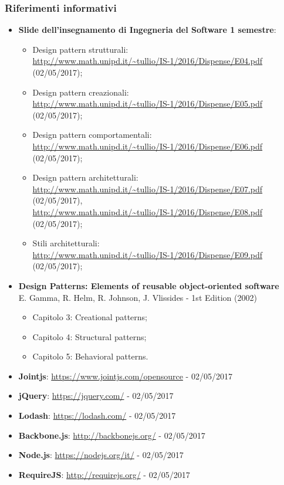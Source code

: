 \documentclass[../DefinizioneDiProdotto.tex]{subfiles}
\begin{document}
			\subsubsection{Riferimenti informativi}	
				\begin{itemize}
					\item \textbf{Slide dell'insegnamento di Ingegneria del Software
					1 semestre}:
					\begin{itemize}
						\item Design pattern strutturali:\\
						\url{http://www.math.unipd.it/~tullio/IS-1/2016/Dispense/E04.pdf} (02/05/2017);
						\item Design pattern creazionali:\\
						\url{http://www.math.unipd.it/~tullio/IS-1/2016/Dispense/E05.pdf} (02/05/2017);
						\item Design pattern comportamentali:\\
						\url{http://www.math.unipd.it/~tullio/IS-1/2016/Dispense/E06.pdf} (02/05/2017);
						\item Design pattern architetturali:\\
						\url{http://www.math.unipd.it/~tullio/IS-1/2016/Dispense/E07.pdf} (02/05/2017),\\
						\url{http://www.math.unipd.it/~tullio/IS-1/2016/Dispense/E08.pdf} (02/05/2017);
						\item Stili architetturali:\\
						\url{http://www.math.unipd.it/~tullio/IS-1/2016/Dispense/E09.pdf} (02/05/2017);
					\end{itemize}
					\item \textbf{Design Patterns: Elements of reusable object-oriented software}\\
					E. Gamma, R. Helm, R. Johnson, J. Vlissides - 1st Edition (2002)
					\begin{itemize}
						\item Capitolo 3: Creational patterns;
						\item Capitolo 4: Structural patterns;
						\item Capitolo 5: Behavioral patterns.
					\end{itemize}
					\item \textbf{Jointjs}: \url{https://www.jointjs.com/opensource} - 02/05/2017
					\item \textbf{jQuery}: \url{https://jquery.com/} - 02/05/2017
					\item \textbf{Lodash}: \url{https://lodash.com/} - 02/05/2017
					\item \textbf{Backbone.js}: \url{http://backbonejs.org/} - 02/05/2017
					\item \textbf{Node.js}: \url{https://nodejs.org/it/} - 02/05/2017
					\item \textbf{RequireJS}: \url{http://requirejs.org/} - 02/05/2017
				\end{itemize}
\end{document}
